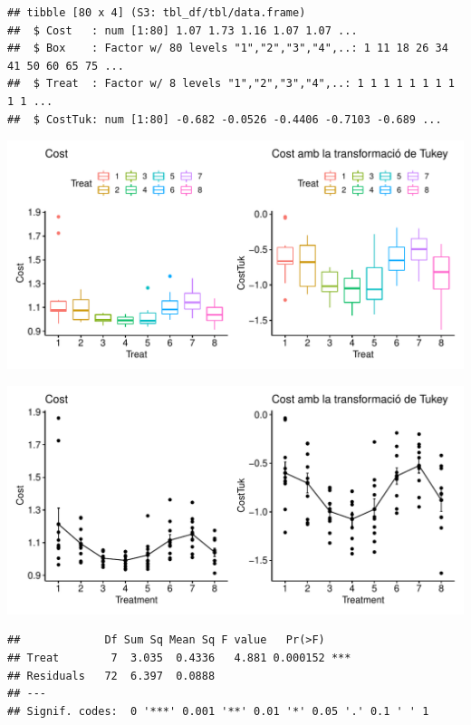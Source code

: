 \documentclass[11pt,a4paper]{article}\usepackage[]{graphicx}\usepackage[]{color}
\makeatletter
\def\maxwidth{ %
  \ifdim\Gin@nat@width>\linewidth
    \linewidth
  \else
    \Gin@nat@width
  \fi
}
\newenvironment{kframe}{%
 \def\at@end@of@kframe{}%
 \ifinner\ifhmode%
  \def\at@end@of@kframe{\end{minipage}}%
  \begin{minipage}{\columnwidth}%
 \fi\fi%
 \def\FrameCommand##1{\hskip\@totalleftmargin \hskip-\fboxsep
 \colorbox{shadecolor}{##1}\hskip-\fboxsep
     \hskip-\linewidth \hskip-\@totalleftmargin \hskip\columnwidth}%
 \MakeFramed {\advance\hsize-\width
   \@totalleftmargin\z@ \linewidth\hsize
   \@setminipage}}%
 {\par\unskip\endMakeFramed%
 \at@end@of@kframe}
\newenvironment{knitrout}{}{} %
\makeatother
\begin{document}
\begin{knitrout}
\color{fgcolor}\begin{kframe}
\begin{verbatim}
## tibble [80 x 4] (S3: tbl_df/tbl/data.frame)
##  $ Cost   : num [1:80] 1.07 1.73 1.16 1.07 1.07 ...
##  $ Box    : Factor w/ 80 levels "1","2","3","4",..: 1 11 18 26 34 41 50 60 65 75 ...
##  $ Treat  : Factor w/ 8 levels "1","2","3","4",..: 1 1 1 1 1 1 1 1 1 1 ...
##  $ CostTuk: num [1:80] -0.682 -0.0526 -0.4406 -0.7103 -0.689 ...
\end{verbatim}
\end{kframe}
\includegraphics[width=\maxwidth]{figure/unnamed-chunk-18-1} 

\includegraphics[width=\maxwidth]{figure/unnamed-chunk-18-2} 
\begin{kframe}\begin{verbatim}
##             Df Sum Sq Mean Sq F value   Pr(>F)    
## Treat        7  3.035  0.4336   4.881 0.000152 ***
## Residuals   72  6.397  0.0888                     
## ---
## Signif. codes:  0 '***' 0.001 '**' 0.01 '*' 0.05 '.' 0.1 ' ' 1
\end{verbatim}
\end{kframe}
\end{knitrout}
\end{document}
